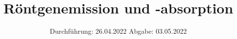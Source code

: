 

\subject{V602}
\title{Röntgenemission und -absorption}
\date{%
  Durchführung: 26.04.2022
  \hspace{3em}
  Abgabe: 03.05.2022
}



\maketitle
\thispagestyle{empty}
\tableofcontents
\newpage






\printbibliography{}
\appendix
\newpage



